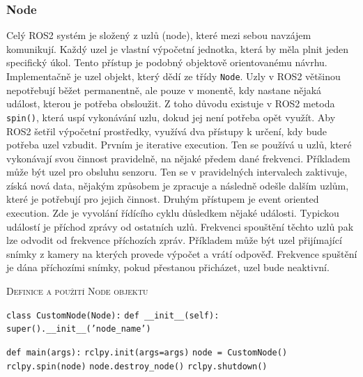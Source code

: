 \subsubsection*{Node}
Celý ROS2 systém je složený z uzlů (node), které mezi sebou navzájem komunikují. Každý uzel je vlastní výpočetní jednotka, která by měla plnit jeden specifický úkol. Tento přístup je podobný objektově orientovanému návrhu. Implementačně je uzel objekt, který dědí ze třídy \verb|Node|.
Uzly v ROS2 většinou nepotřebují běžet permanentně, ale pouze v monentě, kdy nastane nějaká událost, kterou je potřeba obsloužit. Z toho důvodu existuje v ROS2 metoda \verb|spin()|, která uspí vykonávání uzlu, dokud jej není potřeba opět využít. Aby ROS2 šetřil výpočetní prostředky, využívá dva přístupy k určení, kdy bude potřeba uzel vzbudit. Prvním je iterative execution. Ten se používá u uzlů, které vykonávají svou činnost pravidelně, na nějaké předem dané frekvenci. Příkladem může být uzel pro obsluhu senzoru. Ten se v pravidelných intervalech zaktivuje, získá nová data, nějakým způsobem je zpracuje a následně odešle dalším uzlům, které je potřebují pro jejich činnost.
Druhým přístupem je event oriented execution. Zde je vyvolání řídícího cyklu důsledkem nějaké události. Typickou událostí je příchod zprávy od ostatních uzlů. Frekvenci spouštění těchto uzlů pak lze odvodit od frekvence příchozích zpráv. Příkladem může být uzel přijímající snímky z kamery na kterých provede výpočet a vrátí odpověď. Frekvence spuštění je dána příchozími snímky, pokud přestanou přicházet, uzel bude neaktivní. \cite{ros2_introduction} \cite{ros2_documentation}

\begin{algorithm}[h!]
	\label{}
	\caption{\textsc{Definice a použití Node objektu}}
	
	\DontPrintSemicolon
	\SetAlgoNoLine
	\SetNlSty{}{}{:}
	\SetNlSkip{-1.1em}
	
	\BlankLine \Indp\Indpp
	
	\texttt{class CustomNode(Node):}\;
	\Indp\Indp
	\texttt{def \_\_init\_\_(self):}\;
	\Indp\Indp
	\texttt{super().\_\_init\_\_('node\_name')}\;
	\Indm\Indm\Indm\Indm
	
	\BlankLine
	
	\texttt{def main(args):}\;
	\Indp\Indp
	\texttt{rclpy.init(args=args)}\;
	\texttt{node = CustomNode()}\;
	\texttt{rclpy.spin(node)}\;
	\texttt{node.destroy\_node()}\;
	\texttt{rclpy.shutdown()}\;
\end{algorithm}

